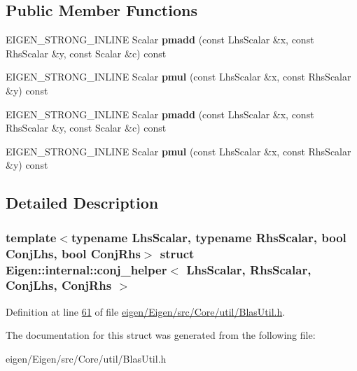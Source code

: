 \subsection*{Public Member Functions}
\begin{DoxyCompactItemize}
\item 
\mbox{\label{struct_eigen_1_1internal_1_1conj__helper_a7b2020c12ab5c5c09f39303d543a4cf2}} 
E\+I\+G\+E\+N\+\_\+\+S\+T\+R\+O\+N\+G\+\_\+\+I\+N\+L\+I\+NE Scalar {\bfseries pmadd} (const Lhs\+Scalar \&x, const Rhs\+Scalar \&y, const Scalar \&c) const
\item 
\mbox{\label{struct_eigen_1_1internal_1_1conj__helper_a10c2bdc3cc1a624a2c8d5d9ccc89679e}} 
E\+I\+G\+E\+N\+\_\+\+S\+T\+R\+O\+N\+G\+\_\+\+I\+N\+L\+I\+NE Scalar {\bfseries pmul} (const Lhs\+Scalar \&x, const Rhs\+Scalar \&y) const
\item 
\mbox{\label{struct_eigen_1_1internal_1_1conj__helper_a7b2020c12ab5c5c09f39303d543a4cf2}} 
E\+I\+G\+E\+N\+\_\+\+S\+T\+R\+O\+N\+G\+\_\+\+I\+N\+L\+I\+NE Scalar {\bfseries pmadd} (const Lhs\+Scalar \&x, const Rhs\+Scalar \&y, const Scalar \&c) const
\item 
\mbox{\label{struct_eigen_1_1internal_1_1conj__helper_a10c2bdc3cc1a624a2c8d5d9ccc89679e}} 
E\+I\+G\+E\+N\+\_\+\+S\+T\+R\+O\+N\+G\+\_\+\+I\+N\+L\+I\+NE Scalar {\bfseries pmul} (const Lhs\+Scalar \&x, const Rhs\+Scalar \&y) const
\end{DoxyCompactItemize}


\subsection{Detailed Description}
\subsubsection*{template$<$typename Lhs\+Scalar, typename Rhs\+Scalar, bool Conj\+Lhs, bool Conj\+Rhs$>$\newline
struct Eigen\+::internal\+::conj\+\_\+helper$<$ Lhs\+Scalar, Rhs\+Scalar, Conj\+Lhs, Conj\+Rhs $>$}



Definition at line \hyperlink{eigen_2_eigen_2src_2_core_2util_2_blas_util_8h_source_l00061}{61} of file \hyperlink{eigen_2_eigen_2src_2_core_2util_2_blas_util_8h_source}{eigen/\+Eigen/src/\+Core/util/\+Blas\+Util.\+h}.



The documentation for this struct was generated from the following file\+:\begin{DoxyCompactItemize}
\item 
eigen/\+Eigen/src/\+Core/util/\+Blas\+Util.\+h\end{DoxyCompactItemize}
